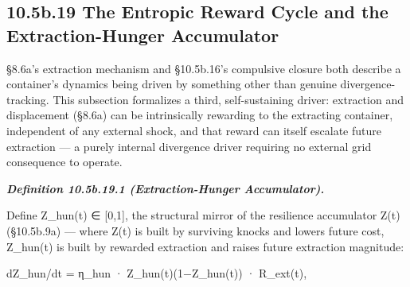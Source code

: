 \documentclass[
]{article}
\begin{document}
\hypertarget{b.19-the-entropic-reward-cycle-and-the-extraction-hunger-accumulator}{%
\subsection{10.5b.19 The Entropic Reward Cycle and the Extraction-Hunger
Accumulator}\label{b.19-the-entropic-reward-cycle-and-the-extraction-hunger-accumulator}}

§8.6a's extraction mechanism and §10.5b.16's compulsive closure both
describe a container's dynamics being driven by something other than
genuine divergence-tracking. This subsection formalizes a third,
self-sustaining driver: extraction and displacement (§8.6a) can be
intrinsically rewarding to the extracting container, independent of any
external shock, and that reward can itself escalate future extraction
--- a purely internal divergence driver requiring no external grid
consequence to operate.

\emph{\textbf{Definition 10.5b.19.1 (Extraction-Hunger Accumulator).}}

Define Z\_hun(t) ∈ {[}0,1{]}, the structural mirror of the resilience
accumulator Z(t) (§10.5b.9a) --- where Z(t) is built by surviving knocks
and lowers future cost, Z\_hun(t) is built by rewarded extraction and
raises future extraction magnitude:

dZ\_hun/dt = η\_hun · Z\_hun(t)(1−Z\_hun(t)) · R\_ext(t),
\end{document}
